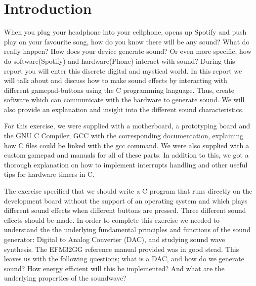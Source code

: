 \chapter{Introduction}

When you plug your headphone into your cellphone, opens up Spotify and push play on your favourite song, how do you know there will be any sound? What do really happen? How does your device generate sound? Or even more specific, how do software(Spotify) and hardware(Phone) interact with sound? During this report you will enter this discrete digital and mystical world. In this report we will talk about and discuss how to make sound effects by interacting with different gamepad-buttons using the C programming language. Thus, create software which can communicate with the hardware to generate sound. We will also provide an explanation and insight into the different sound characteristics.

For this exercise, we were supplied with a motherboard, a prototyping board and the GNU C Compiler; GCC with the corresponding documentation, explaining how C files could be linked with the gcc command. We were also supplied with a custom gamepad and manuals for all of these parts. In addition to this, we got a thorough explanation on how to implement interrupts handling and other useful tips for hardware timers in C. 

The exercise specified that we should write a C program that runs directly on the development board without the support of an operating system and which plays different sound effects when different buttons are pressed. Three different sound effects should be made. In order to complete this exercise we needed to understand the the underlying fundamental principles and functions of the sound generator: Digital to Analog Converter (DAC), and studying sound wave synthesis. The EFM32GG reference manual provided was in good stead. 
This leaves us with the following questions; what is a DAC, and how do we generate sound? How energy efficient will this be implemented? And what are the underlying properties of the soundwave?